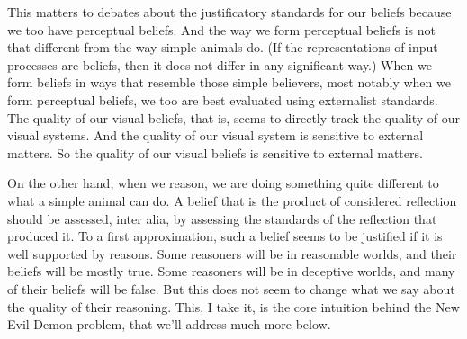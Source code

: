 This matters to debates about the justificatory standards for our beliefs because we too have perceptual beliefs. And the way we form perceptual beliefs is not that different from the way simple animals do. (If the representations of input processes are beliefs, then it does not differ in any significant way.) When we form beliefs in ways that resemble those simple believers, most notably when we form perceptual beliefs, we too are best evaluated using externalist standards. The quality of our visual beliefs, that is, seems to directly track the quality of our visual systems. And the quality of our visual system is sensitive to external matters. So the quality of our visual beliefs is sensitive to external matters.

On the other hand, when we reason, we are doing something quite different to what a simple animal can do. A belief that is the product of considered reflection should be assessed, inter alia, by assessing the standards of the reflection that produced it. To a first approximation, such a belief seems to be justified if it is well supported by reasons. Some reasoners will be in reasonable worlds, and their beliefs will be mostly true. Some reasoners will be in deceptive worlds, and many of their beliefs will be false. But this does not seem to change what we say about the quality of their reasoning. This, I take it, is the core intuition behind the New Evil Demon problem, that we'll address much more below.

